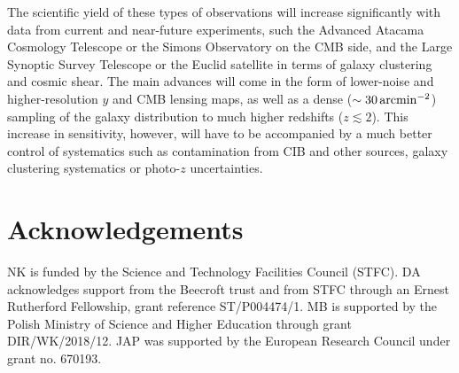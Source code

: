 \documentclass[useAMS,usenatbib]{mn2e}
\begin{document}
  The scientific yield of these types of observations will increase significantly with data from current and near-future experiments, such the Advanced Atacama Cosmology Telescope \citep{2016SPIE.9910E..14D} or the Simons Observatory \citep{2019JCAP...02..056A} on the CMB side, and the Large Synoptic Survey Telescope \citep{2009arXiv0912.0201L} or the Euclid satellite \citep{2011arXiv1110.3193L} in terms of galaxy clustering and cosmic shear. The main advances will come in the form of lower-noise and higher-resolution $y$ and CMB lensing maps, as well as a dense ($\sim30\,{\rm arcmin}^{-2}$) sampling of the galaxy distribution to much higher redshifts ($z\lesssim2$). This increase in sensitivity, however, will have to be accompanied by a much better control of systematics such as contamination from CIB and other sources, galaxy clustering systematics or photo-$z$ uncertainties.

\section*{Acknowledgements}
  NK is funded by the Science and Technology Facilities Council (STFC). DA acknowledges support from the Beecroft trust and from STFC through an Ernest Rutherford Fellowship, grant reference ST/P004474/1. MB is supported by the Polish Ministry of Science and Higher Education through grant DIR/WK/2018/12. JAP was supported by the European Research Council under grant no. 670193.
  
\setlength{\bibhang}{2.0em}
\setlength{}

\end{document}
